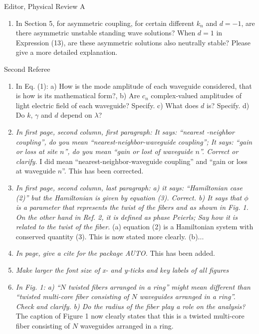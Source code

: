 \documentclass[11pt]{letter}
\begin{document}
\begin{letter}{Editor, Physical Review A}
\begin{enumerate}
\item In Section 5, for asymmetric coupling, for certain different $k_{n}$ and $d=-1$, are there asymmetric unstable standing wave solutions? When $d=1$ in Expression (13), are these asymmetric solutions also neutrally stable? Please give a more detailed explanation.

\end{enumerate}

Second Referee
\begin{enumerate}
\item In Eq. (1): a) How is the mode amplitude of each waveguide considered, that is how is its mathematical form?, b) Are $c_n$ complex-valued amplitudes of light electric field of each waveguide? Specify. c) What does $d$ is? Specify. d) Do $k$, $\gamma$ and $d$ depend on $\lambda$?

\item \emph{In first page, second column, first paragraph: It says: ``nearest -neighbor coupling'', do you mean ``nearest-neighbor-waveguide coupling''; It says: ``gain or loss at site $n$'', do you mean ``gain or lost of waveguide $n$''. Correct or clarify.} I did mean ``nearest-neighbor-waveguide coupling'' and ``gain or loss at waveguide $n$''. This has been corrected.

\item \emph{In first page, second column, last paragraph: a) it says: ``Hamiltonian case (2)'' but the Hamiltonian is given by equation (3). Correct. b) It says that $\phi$ is a parameter that represents the twist of the fibers and as shown in Fig. 1. On the other hand in Ref. 2, it is defined as phase Peierls; Say how it is related to the twist of the fiber.} (a) equation (2) is a Hamiltonian system with conserved quantity (3). This is now stated more clearly. (b)...

\item \emph{In page, give a cite for the package AUTO.} This has been added.

\item \emph{Make larger the font size of x- and y-ticks and key labels of all figures}

\item \emph{In Fig. 1: a) ``$N$ twisted fibers arranged in a ring'' might mean different than ``twisted multi-core fiber consisting of $N$ waveguides arranged in a ring''. Check and clarify. b) Do the radius of the fiber play a role on the analysis?} The caption of Figure 1 now clearly states that this is a twisted multi-core fiber consisting of $N$ waveguides arranged in a ring.


\end{enumerate}
\end{letter}
\end{document}
